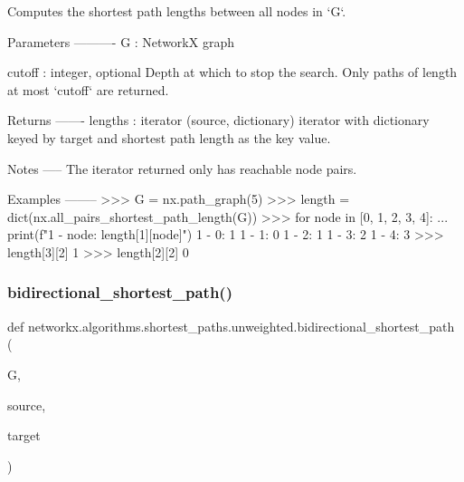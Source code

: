 \begin{DoxyVerb}Computes the shortest path lengths between all nodes in `G`.

Parameters
----------
G : NetworkX graph

cutoff : integer, optional
    Depth at which to stop the search. Only paths of length at most
    `cutoff` are returned.

Returns
-------
lengths : iterator
    (source, dictionary) iterator with dictionary keyed by target and
    shortest path length as the key value.

Notes
-----
The iterator returned only has reachable node pairs.

Examples
--------
>>> G = nx.path_graph(5)
>>> length = dict(nx.all_pairs_shortest_path_length(G))
>>> for node in [0, 1, 2, 3, 4]:
...     print(f"1 - {node}: {length[1][node]}")
1 - 0: 1
1 - 1: 0
1 - 2: 1
1 - 3: 2
1 - 4: 3
>>> length[3][2]
1
>>> length[2][2]
0\end{DoxyVerb}
 \mbox{\label{namespacenetworkx_1_1algorithms_1_1shortest__paths_1_1unweighted_aa5ec04fdd8442bb9261c266a31a75f75}} 
\subsubsection{\texorpdfstring{bidirectional\+\_\+shortest\+\_\+path()}{bidirectional\_shortest\_path()}}
{\footnotesize\ttfamily def networkx.\+algorithms.\+shortest\+\_\+paths.\+unweighted.\+bidirectional\+\_\+shortest\+\_\+path (\begin{DoxyParamCaption}\item[{}]{G,  }\item[{}]{source,  }\item[{}]{target }\end{DoxyParamCaption})}

